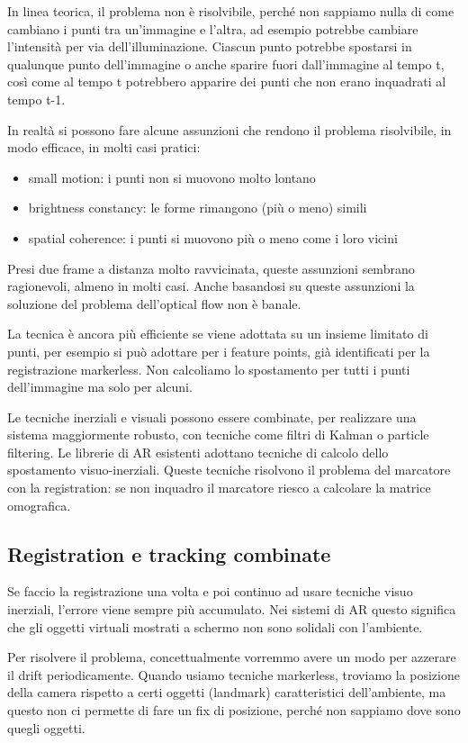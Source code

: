 In linea teorica, il problema non è risolvibile, perché non sappiamo nulla di come cambiano i punti tra un'immagine e l'altra, ad esempio potrebbe cambiare l'intensità per via dell'illuminazione.
Ciascun punto potrebbe spostarsi in qualunque punto dell'immagine o anche sparire fuori dall'immagine al tempo t, così come al tempo t potrebbero apparire dei punti che non erano inquadrati al tempo t-1. 

In realtà si possono fare alcune assunzioni che rendono il problema risolvibile, in modo efficace, in molti casi pratici:
\begin{itemize}
    \item small motion: i punti non si muovono molto lontano
    \item brightness constancy: le forme rimangono (più o meno) simili
    \item spatial coherence: i punti si muovono più o meno come i loro vicini
\end{itemize}

Presi due frame a distanza molto ravvicinata, queste assunzioni sembrano ragionevoli, almeno in molti casi. 
Anche basandosi su queste assunzioni la soluzione del problema dell'optical flow non è banale.

La tecnica è ancora più efficiente se viene adottata su un insieme limitato di punti, per esempio si può adottare per i feature points, già identificati per la registrazione markerless. Non calcoliamo lo spostamento per tutti i punti dell'immagine ma solo per alcuni.

Le tecniche inerziali e visuali possono essere combinate, per realizzare una sistema maggiormente robusto, con tecniche come filtri di Kalman o particle filtering. 
Le librerie di AR esistenti adottano tecniche di calcolo dello spostamento visuo-inerziali.
Queste tecniche risolvono il problema del marcatore con la registration: se non inquadro il marcatore riesco a calcolare la matrice omografica. 
 
\subsection{Registration e tracking combinate}
Se faccio la registrazione una volta e poi continuo ad usare tecniche visuo inerziali, l'errore viene sempre più accumulato. Nei sistemi di AR questo significa che gli oggetti virtuali mostrati a schermo non sono solidali con l'ambiente.

Per risolvere il problema, concettualmente vorremmo avere un modo per azzerare il drift periodicamente. 
Quando usiamo tecniche markerless, troviamo la posizione della camera rispetto a certi oggetti (landmark) caratteristici dell'ambiente, ma questo non ci permette di fare un fix di posizione, perché non sappiamo dove sono quegli oggetti. 

